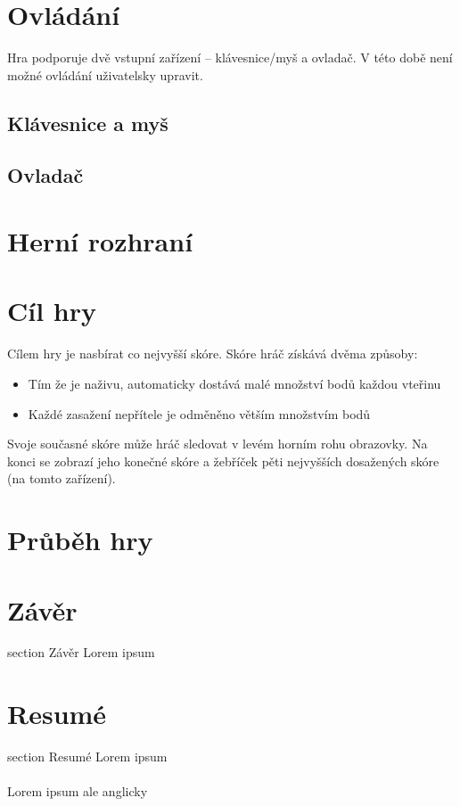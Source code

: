 \documentclass[12pt,a4paper,hidelinks]{article}
\begin{document}
\section{Ovládání}
Hra podporuje dvě vstupní zařízení – klávesnice/myš a ovladač. V této době není možné ovládání uživatelsky upravit.
\subsection{Klávesnice a myš}

\subsection{Ovladač}

\section{Herní rozhraní}

\section{Cíl hry}
Cílem hry je nasbírat co nejvyšší skóre.
Skóre hráč získává dvěma způsoby:
\begin{itemize}
	\item Tím že je naživu, automaticky dostává malé množství bodů každou vteřinu
	\item Každé zasažení nepřítele je odměněno větším množstvím bodů
\end{itemize}	
Svoje současné skóre může hráč sledovat v levém horním rohu obrazovky. Na konci se zobrazí jeho konečné skóre a žebříček pěti nejvyšších dosažených skóre (na tomto zařízení).
\section{Průběh hry}


\clearpage
\section*{Závěr}
 {section} {Závěr}
Lorem ipsum

\clearpage

\section*{Resumé}
 {section} {Resumé}
Lorem ipsum\\
\\
Lorem ipsum ale anglicky\\
\end{document}
